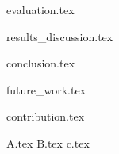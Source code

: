 \documentclass[11pt,a4paper]{report}
\numberwithin{figure}{section}
\numberwithin{table}{section}
\begin{document}
{evaluation.tex}
\clearpage

{results_discussion.tex}
\clearpage

{conclusion.tex}
\clearpage

{future_work.tex}
\clearpage

{contribution.tex}
\clearpage

\appendix
{A.tex}
{B.tex}
{c.tex}
\clearpage



\thispagestyle{empty}
\clearpage
\end{document}
